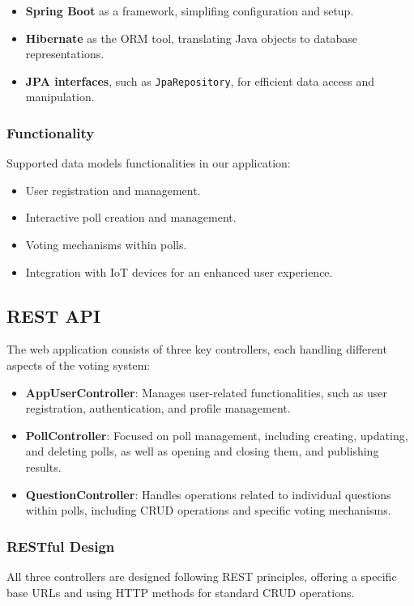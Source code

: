 \begin{itemize}
    \item \textbf{Spring Boot} as a framework, simplifing configuration and setup.
    \item \textbf{Hibernate} as the ORM tool, translating Java objects to database representations.
    \item \textbf{JPA interfaces}, such as \texttt{JpaRepository}, for efficient data access and manipulation.
\end{itemize}

\subsubsection{Functionality}

Supported data models functionalities in our application:
\begin{itemize}
    \item User registration and management.
    \item Interactive poll creation and management.
    \item Voting mechanisms within polls.
    \item Integration with IoT devices for an enhanced user experience.
\end{itemize}

\subsection{REST API}
The web application consists of three key controllers, each handling different aspects of the voting system:

\begin{itemize}
    \item \textbf{AppUserController}: Manages user-related functionalities, such as user registration, authentication, and profile management.
    \item \textbf{PollController}: Focused on poll management, including creating, updating, and deleting polls, as well as opening and closing them, and publishing results.
    \item \textbf{QuestionController}: Handles operations related to individual questions within polls, including CRUD operations and specific voting mechanisms.
\end{itemize}

\subsubsection{RESTful Design}
All three controllers are designed following REST principles, offering a specific base URLs and using HTTP methods for standard CRUD operations.

